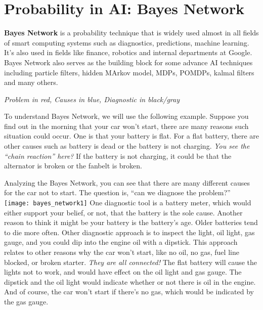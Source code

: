 \documentclass[12pt]{article}
\begin{document}
\section*{Probability in AI: Bayes Network}
\textbf{Bayes Network} is a probability technique that is widely used almost in all fields of smart computing systems such as diagnostics, predictions, machine learning. It's also used in fields like finance, robotics and internal departments at Google. Bayes Network also serves as the building block for some advance AI techniques including particle filters, hidden MArkov model, MDPs, POMDPs, kalmal filters and many others.
\begin{center}
\textit{Problem in \colorbox{myRed}{red}, Causes in \colorbox{myBlue}{blue}, Diagnostic in \colorbox{myGray}{black/gray}}
\end{center}
\par
To understand Bayes Network, we will use the following example. Suppose you find out in the morning that your \colorbox{myRed}{car won't start}, there are many reasons such situation could occur. One is that your \colorbox{myBlue}{battery is flat}. For a flat battery, there are other causes such as \colorbox{myBlue}{battery is dead} or the \colorbox{myBlue}{battery is not charging}. \textit{You see the \enquote{chain reaction} here?} If the battery is not charging, it could be that the \colorbox{myBlue}{alternator is broken} or the \colorbox{myBlue}{fanbelt is broken}.\par
Analyzing the Bayes Network, you can see that there are many different causes for the car not to start. The question is, \enquote{can we diagnose the problem?}\\
\vspace{2em}
\texttt{[image: bayes\_network1]}
One diagnostic tool is a \colorbox{myGray}{battery meter}, which would either support your belief, or not, that the battery is the sole cause. Another reason to think it might be your battery is the \colorbox{myGray}{battery's age}. Older batteries tend to die more often. Other diagnostic approach is to inspect the \colorbox{myGray}{light}, \colorbox{myGray}{oil light}, \colorbox{myGray}{gas gauge}, and you could dip into the engine oil with a \colorbox{myGray}{dipstick}. This approach relates to other reasons why the car won't start, like \colorbox{myBlue}{no oil}, \colorbox{myBlue}{no gas}, \colorbox{myBlue}{fuel line blocked}, or \colorbox{myBlue}{broken starter}. \textit{They are all connected!} The flat battery will cause the lights not to work, and would have effect on the oil light and gas gauge. The dipstick and the oil light would indicate whether or not there is oil in the engine. And of course, the car won't start if there's no gas, which would be indicated by the gas gauge.\\
\end{document}

